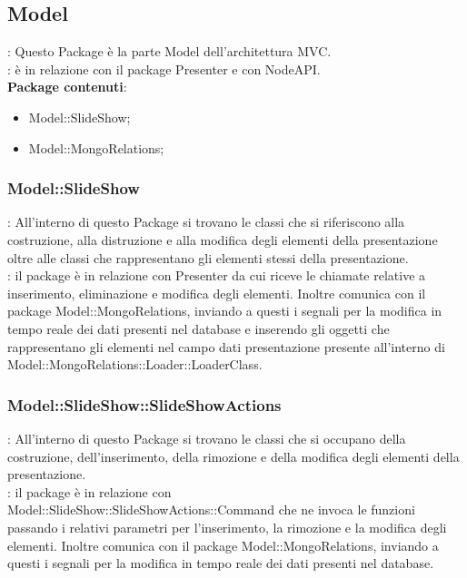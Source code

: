 \subsection{Model}{
	\textbf{\tipo}: Questo Package è la parte Model dell'architettura MVC.\\
	\textbf{\relaz}: è in relazione con il package Presenter e con NodeAPI.\\
	\textbf{Package contenuti}: 
	\begin{itemize}
	\item Model::SlideShow;
    \item Model::MongoRelations;
	\end{itemize}
}
\subsubsection{Model::SlideShow}{
		\textbf{\tipo}: All’interno di questo Package si trovano le classi che si riferiscono alla costruzione, alla distruzione e alla modifica degli elementi della presentazione oltre alle classi che rappresentano gli elementi stessi della presentazione.\\
        \textbf{\relaz}: il package è in relazione con Presenter da cui riceve le chiamate relative a inserimento, eliminazione e modifica degli elementi. Inoltre comunica con il package Model::MongoRelations, inviando a questi i segnali per la modifica in tempo reale dei dati presenti nel database e inserendo gli oggetti che rappresentano gli elementi nel campo dati presentazione presente all'interno di Model::MongoRelations::Loader::LoaderClass.\\
    }
\subsubsection{Model::SlideShow::SlideShowActions}{
		\textbf{\tipo}: All’interno di questo Package si trovano le classi che si occupano della costruzione, dell'inserimento, della rimozione e della modifica degli elementi della presentazione.\\
        \textbf{\relaz}: il package è in relazione con\\ Model::SlideShow::SlideShowActions::Command che ne invoca le funzioni passando i relativi parametri per l'inserimento, la rimozione e la modifica degli elementi. Inoltre comunica con il package Model::MongoRelations, inviando a questi i segnali per la modifica in tempo reale dei dati presenti nel database.\\
    }
    
